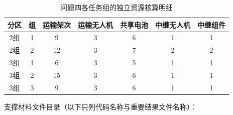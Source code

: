 \documentclass[bwprint]{gmcmthesis}
\begin{document}
\begin{appendices}
\begin{table}[H]
\centering
\caption{问题四各任务组的独立资源核算明细}
\label{tab:appq4}
\renewcommand\arraystretch{1.15}
\begin{tabularx}{\textwidth}{|c|C|C|C|C|C|C|}
  \hline
  分区 & 组 & 运输架次 & 运输无人机 & 共享电池 & 中继无人机 & 中继组件 \\
  \hline
  2组 & 1 & 9 & 3 & 6 & 1 & 1 \\
  2组 & 2 & 12 & 3 & 7 & 2 & 2 \\
  3组 & 1 & 6 & 3 & 5 & 1 & 1 \\
  3组 & 2 & 15 & 3 & 6 & 1 & 1 \\
  3组 & 3 & 9 & 3 & 6 & 1 & 1 \\
  \hline
\end{tabularx}
\end{table}

\par\noindent\hspace{2em}支撑材料文件目录（以下只列代码名称与重要结果文件名称）：\par


\end{appendices}
\end{document}
